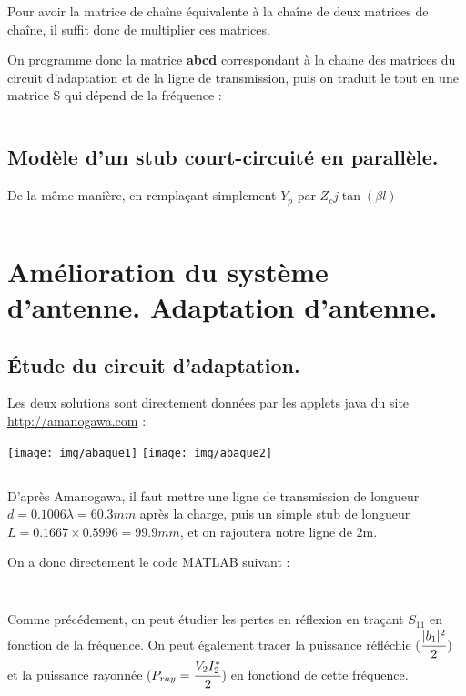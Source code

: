 \documentclass[10pt]{article}
\begin{document}
\begin{itemize}
        Pour avoir la matrice de chaîne équivalente à la chaîne de deux matrices de chaîne, il suffit donc de multiplier ces matrices.

        On programme donc la matrice \textbf{abcd} correspondant à la chaine des matrices du circuit d'adaptation et de la ligne de transmission, puis on traduit le tout en une matrice S qui dépend de la fréquence : 

        \inputminted[linenos,firstline=32,firstnumber=32,lastline=49]{matlab}{src/BE.m}


\end{itemize}

\subsection{Modèle d'un stub court-circuité en parallèle.}
De la même manière, en remplaçant simplement $Y_p$ par $Z_c j \tan(\beta l)$

\inputminted[linenos,firstline=50,firstnumber=50]{matlab}{src/BE.m}


\section{Amélioration du système d'antenne. Adaptation d'antenne.}
\subsection{Étude du circuit d'adaptation.}
Les deux solutions sont directement données par les applets java du site \url{http://amanogawa.com} :

\begin{center}
    \texttt{[image: img/abaque1]}
    \texttt{[image: img/abaque2]}
\end{center}
\subsection{}

D'après Amanogawa, il faut mettre une ligne de transmission de longueur $d=0.1006 \lambda = 60.3mm$ après la charge, puis un simple stub de longueur $L=0.1667\times 0.5996=99.9mm$, et on rajoutera notre ligne de 2m.

On a donc directement le code MATLAB suivant :

\inputminted[linenos]{matlab}{src/2b.m}

\subsection{}
Comme précédement, on peut étudier les pertes en réflexion en traçant $S_{11}$ en fonction de la fréquence. On peut également tracer la puissance réfléchie ($\cfrac{|b_1|^2}{2}$) et la puissance rayonnée ($P_{ray} = \cfrac{V_2I_2^\ast}{2}$) en fonctiond de cette fréquence.

\inputminted[linenos]{matlab}{src/2c.m}
\end{document}
